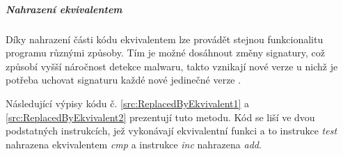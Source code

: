 \noindent
\begin{minipage}[t]{.475\textwidth}
    
\end{minipage}
\hfill
\begin{minipage}[t]{.475\textwidth}
    
\end{minipage}

\subparagraph*{Nahrazení ekvivalentem}
Díky nahrazení části kódu ekvivalentem lze provádět stejnou funkcionalitu programu různými způsoby. Tím je možné dosáhnout změny signatury, což způsobí vyšší náročnost detekce malwaru, takto vznikají nové verze u nichž je potřeba uchovat signaturu každé nové jedinečné verze \cite{13355040520180901}. 

Následující výpisy kódu č. \ref{src:ReplacedByEkvivalent1} a \ref{src:ReplacedByEkvivalent2} prezentují tuto metodu. Kód se liší ve dvou podstatných instrukcích, jež vykonávají ekvivalentní funkci a to instrukce \emph{test} nahrazena ekvivalentem \emph{cmp} a instrukce \emph{inc} nahrazena \emph{add}.

\noindent
\begin{minipage}[t]{.475\textwidth}
    
\end{minipage}
\hfill
\begin{minipage}[t]{.475\textwidth}
    
\end{minipage}


